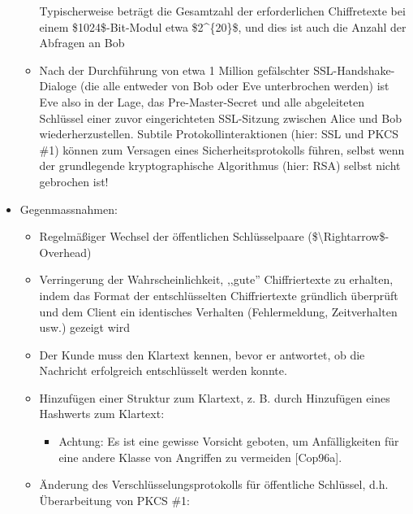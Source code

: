 \documentclass[a4paper]{article}
\begin{document}
\begin{multicols}{3}
\begin{itemize}
\begin{itemize}
                        Typischerweise beträgt die Gesamtzahl der erforderlichen
                        Chiffretexte bei einem \$1024\$-Bit-Modul etwa \$2\^{}\{20\}\$, und
                        dies ist auch die Anzahl der Abfragen an Bob
                  \item
                        Nach der Durchführung von etwa 1 Million gefälschter
                        SSL-Handshake-Dialoge (die alle entweder von Bob oder Eve
                        unterbrochen werden) ist Eve also in der Lage, das Pre-Master-Secret
                        und alle abgeleiteten Schlüssel einer zuvor eingerichteten
                        SSL-Sitzung zwischen Alice und Bob wiederherzustellen. Subtile
                        Protokollinteraktionen (hier: SSL und PKCS \#1) können zum Versagen
                        eines Sicherheitsprotokolls führen, selbst wenn der grundlegende
                        kryptographische Algorithmus (hier: RSA) selbst nicht gebrochen ist!
              \end{itemize}
        \item
              Gegenmassnahmen:

              \begin{itemize}
                  \item
                        Regelmäßiger Wechsel der öffentlichen Schlüsselpaare
                        (\$\textbackslash Rightarrow\$-Overhead)
                  \item
                        Verringerung der Wahrscheinlichkeit, ,,gute'' Chiffriertexte zu
                        erhalten, indem das Format der entschlüsselten Chiffriertexte
                        gründlich überprüft und dem Client ein identisches Verhalten
                        (Fehlermeldung, Zeitverhalten usw.) gezeigt wird
                  \item
                        Der Kunde muss den Klartext kennen, bevor er antwortet, ob die
                        Nachricht erfolgreich entschlüsselt werden konnte.
                  \item
                        Hinzufügen einer Struktur zum Klartext, z. B. durch Hinzufügen eines
                        Hashwerts zum Klartext:

                        \begin{itemize}
                            \item
                                  Achtung: Es ist eine gewisse Vorsicht geboten, um Anfälligkeiten
                                  für eine andere Klasse von Angriffen zu vermeiden {[}Cop96a{]}.
                        \end{itemize}
                  \item
                        Änderung des Verschlüsselungsprotokolls für öffentliche Schlüssel,
                        d.h. Überarbeitung von PKCS \#1:


\end{itemize}
\end{itemize}
\end{multicols}
\end{document}
